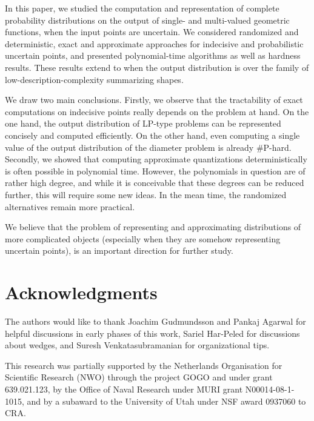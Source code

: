 \documentclass{journal}
\begin{document}
In this paper, we studied the computation and representation of complete probability distributions on the output of single- and multi-valued geometric functions, when the input points are uncertain. 
We considered randomized and deterministic, exact and approximate approaches for indecisive and probabilistic uncertain points, and presented polynomial-time algorithms as well as hardness results.
These results extend to when the output distribution is over the family of low-description-complexity summarizing shapes. 

We draw two main conclusions.
Firstly, we observe that the tractability of exact computations on indecisive points really depends on the problem at hand. On the one hand, the output distribution of LP-type problems can be represented concisely and computed efficiently. On the other hand, even computing a single value of the output distribution of the diameter problem is already \#P-hard.
Secondly, we showed that computing approximate quantizations deterministically is often possible in polynomial time. However, the polynomials in question are of rather high degree, and while it is conceivable that these degrees can be reduced further, this will require some new ideas. In the mean time, the randomized alternatives remain more practical.

We believe that the problem of representing and approximating distributions of more complicated objects (especially when they are somehow representing uncertain points), is an important direction for further study.  










\section*{Acknowledgments}
The authors would like to thank Joachim Gudmundsson and Pankaj Agarwal for helpful discussions in early phases of this work, Sariel Har-Peled for discussions about wedges, and Suresh Venkatasubramanian for organizational tips.  

This research was partially supported by the Netherlands Organisation for
Scientific Research (NWO) through the project GOGO and under grant 639.021.123,
by the Office of Naval Research under MURI grant N00014-08-1-1015,
and by a subaward to the University of Utah under NSF award 0937060 to CRA.

\newpage


\end{document}
